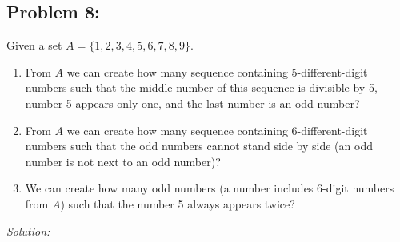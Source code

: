 \documentclass[a4paper]{article}
\begin{document}
\subsection*{Problem 8:}
Given a set $A = \{1,2,3,4,5,6,7,8,9\}$.
\begin{enumerate}
	\item From $A$ we can create how many sequence containing 5-different-digit numbers such that the middle number of this sequence is divisible by 5, number 5 appears only one, and the last number is an odd number?
	\item From $A$ we can create how many sequence containing 6-different-digit numbers such that the odd numbers cannot stand side by side (an odd number is not next to an odd number)?
	\item We can create how many odd numbers (a number includes 6-digit numbers from $A$) such that the number 5 always appears twice?
\end{enumerate}
\textit{Solution:} \\
\end{document}
